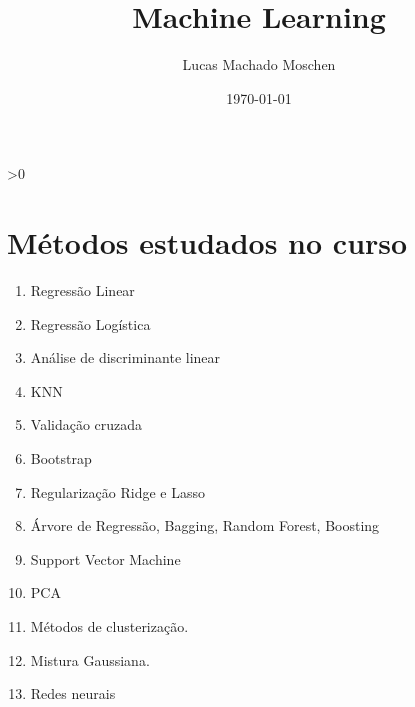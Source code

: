 \documentclass[10pt, twocolumn]{article}
\title{Machine Learning}
\author{Lucas Machado Moschen}
\affil{School of Applied Mathematics, \\ Fundação Getulio Vargas}
\date{\today}
\begin{document}
\setcounter{num}{0}

\twocolumn[
    \begin{@twocolumnfalse}

        \maketitle

        \begin{abstract}
            
        \end{abstract}

        \vspace{5mm}

    \end{@twocolumnfalse}
]

\ifnum \value{num}>0
    {
    
    
    
    }
\else 
    {
    
    
    
    
    
    
    }
\fi

\newpage

\section*{Métodos estudados no curso}

\begin{enumerate}
    \item Regressão Linear
    \item Regressão Logística 
    \item Análise de discriminante linear 
    \item KNN
    \item Validação cruzada 
    \item Bootstrap
    \item Regularização Ridge e Lasso
    \item Árvore de Regressão, Bagging, Random Forest, Boosting 
    \item Support Vector Machine
    \item PCA 
    \item Métodos de clusterização. 
    \item Mistura Gaussiana.
    \item Redes neurais
\end{enumerate}

    \newpage



\twocolumn[
    \begin{@twocolumnfalse}
         
    \end{@twocolumnfalse}
]
\end{document}

